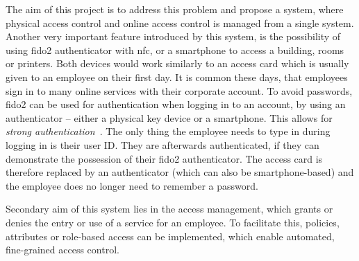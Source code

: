 The aim of this project is to address this problem and propose a system, where physical access control and online access control is managed from a single system. Another very important feature introduced by this system, is the possibility of using \acrshort{fido}2 authenticator with \acrshort{nfc}, or a smartphone to access a building, rooms or printers. Both devices would work similarly to an access card which is usually given to an employee on their first day. It is common these days, that employees sign in to many online services with their corporate account. To avoid passwords, \acrshort{fido}2 can be used for authentication when logging in to an account, by using an authenticator -- either a physical key device or a smartphone. This allows for \textit{strong authentication}~\cite{McDowell2017WhyAlliance}. The only thing the employee needs to type in during logging in is their user ID. They are afterwards authenticated, if they can demonstrate the possession of their \acrshort{fido}2 authenticator. The access card is therefore replaced by an authenticator (which can also be smartphone-based) and the employee does no longer need to remember a password.

Secondary aim of this system lies in the access management, which grants or denies the entry or use of a service for an employee. To facilitate this, policies, attributes or role-based access can be implemented, which enable automated, fine-grained access control.





